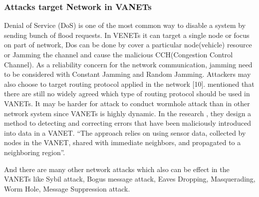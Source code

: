 \documentclass[conference]{IEEEtran}
\begin{document}
\subsubsection{Attacks target Network in VANETs}
Denial of Service (DoS) is one of the most common way to disable a system by sending bunch of flood requests. In VENETs it can target a single node or focus on part of network, Dos can be done by cover a particular node(vehicle) resource or Jamming the channel and cause the malicious CCH(Congestion Control Channel). As a reliability concern for the network communication, jamming need to be considered with Constant Jamming and Random Jamming. Attackers may also choose to target routing protocol applied in the network [10]. \cite{Sta} mentioned that there are still no widely agreed which type of routing protocol should be used in VANETs. It may be harder for attack to conduct wormhole attack than in other network system since VANETs is highly dynamic. In the research \cite{Way}, they design a method to detecting and correcting errors that have been maliciously introduced into data in a VANET. ``The approach relies on using sensor data, collected by nodes in the VANET, shared with immediate neighbors, and propagated to a neighboring region''\cite{Way}.

And there are many other network attacks which also can be effect in the VANETs like Sybil attack, Bogus message attack, Eaves Dropping, Masquerading, Worm Hole, Message Suppression attack.\cite{S-9}
\end{document}
